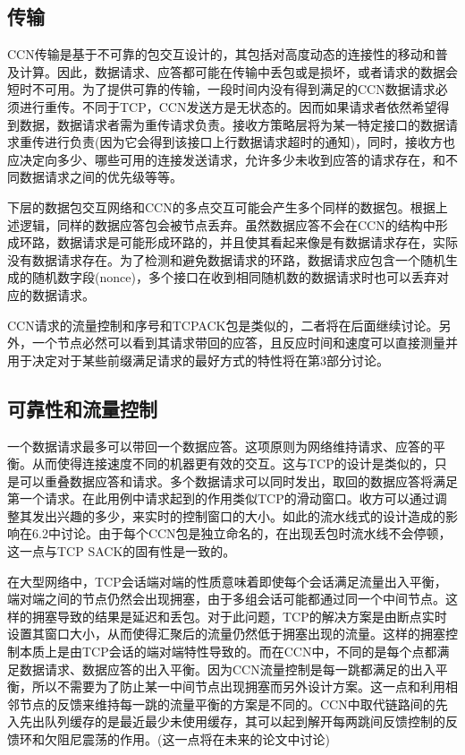\subsection{传输}
\par
CCN传输是基于不可靠的包交互设计的，其包括对高度动态的连接性的移动和普及计算。因此，数据请求、应答都可能在传输中丢包或是损坏，或者请求的数据会短时不可用。为了提供可靠的传输，一段时间内没有得到满足的CCN数据请求必须进行重传。不同于TCP，CCN发送方是无状态的。因而如果请求者依然希望得到数据，数据请求者需为重传请求负责。接收方策略层将为某一特定接口的数据请求重传进行负责(因为它会得到该接口上行数据请求超时的通知)，同时，接收方也应决定向多少、哪些可用的连接发送请求，允许多少未收到应答的请求存在，和不同数据请求之间的优先级等等。
\par
下层的数据包交互网络和CCN的多点交互可能会产生多个同样的数据包。根据上述逻辑，同样的数据应答包会被节点丢弃。虽然数据应答不会在CCN的结构中形成环路，数据请求是可能形成环路的，并且使其看起来像是有数据请求存在，实际没有数据请求存在。为了检测和避免数据请求的环路，数据请求应包含一个随机生成的随机数字段(nonce)，多个接口在收到相同随机数的数据请求时也可以丢弃对应的数据请求。
\par
CCN请求的流量控制和序号和TCPACK包是类似的，二者将在后面继续讨论。另外，一个节点必然可以看到其请求带回的应答，且反应时间和速度可以直接测量并用于决定对于某些前缀满足请求的最好方式的特性将在第3部分讨论。

\subsection{可靠性和流量控制}
\par
一个数据请求最多可以带回一个数据应答。这项原则为网络维持请求、应答的平衡。从而使得连接速度不同的机器更有效的交互。这与TCP的设计是类似的，只是可以重叠数据应答和请求。多个数据请求可以同时发出，取回的数据应答将满足第一个请求。在此用例中请求起到的作用类似TCP的滑动窗口。收方可以通过调整其发出兴趣的多少，来实时的控制窗口的大小。如此的流水线式的设计造成的影响在6.2中讨论。由于每个CCN包是独立命名的，在出现丢包时流水线不会停顿，这一点与TCP SACK的固有性是一致的。
\par
在大型网络中，TCP会话端对端的性质意味着即使每个会话满足流量出入平衡，端对端之间的节点仍然会出现拥塞，由于多组会话可能都通过同一个中间节点。这样的拥塞导致的结果是延迟和丢包。对于此问题，TCP的解决方案是由断点实时设置其窗口大小，从而使得汇聚后的流量仍然低于拥塞出现的流量。这样的拥塞控制本质上是由TCP会话的端对端特性导致的。而在CCN中，不同的是每个点都满足数据请求、数据应答的出入平衡。因为CCN流量控制是每一跳都满足的出入平衡，所以不需要为了防止某一中间节点出现拥塞而另外设计方案。这一点和利用相邻节点的反馈来维持每一跳的流量平衡的方案是不同的。CCN中取代链路间的先入先出队列缓存的是最近最少未使用缓存，其可以起到解开每两跳间反馈控制的反馈环和欠阻尼震荡的作用。(这一点将在未来的论文中讨论)

